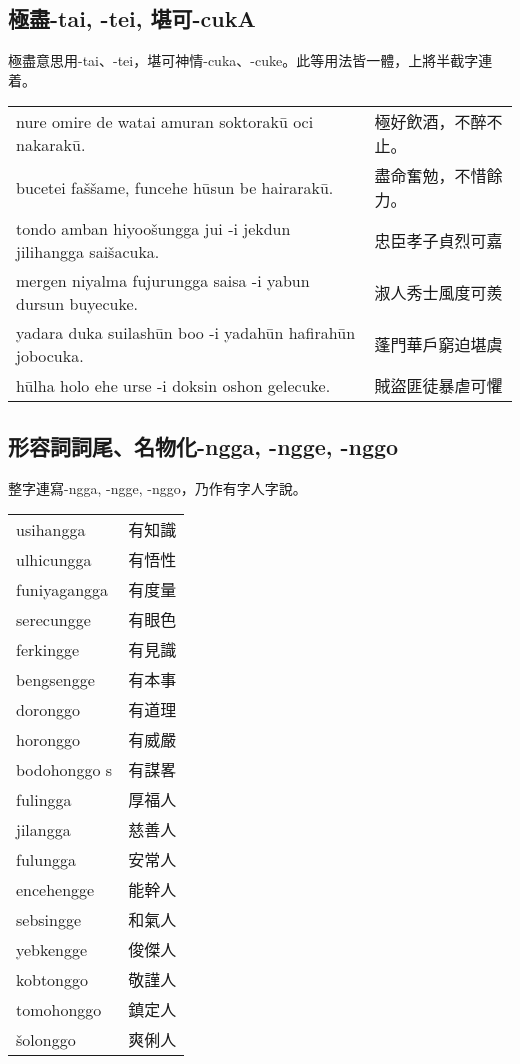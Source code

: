 \documentclass{article}
\begin{document}
\subsection{極盡-tai, -tei, 堪可-cukA}
\noindent 極盡意思用-tai、-tei，堪可神情-cuka、-cuke。此等用法皆一體，上將半截字連着。
\begin{center}
    \begin{tabularx}{\textwidth}{XX}
        nure omire de watai amuran soktorak\={u} oci nakarak\={u}. & 極好飲酒，不醉不止。\\
        bucetei fa\v{s}\v{s}ame, funcehe h\={u}sun be hairarak\={u}. & 盡命奮勉，不惜餘力。\\
        tondo amban hiyoo\v{s}ungga jui -i jekdun jilihangga sai\v{s}acuka. & 忠臣孝子貞烈可嘉\\
        mergen niyalma fujurungga saisa -i yabun dursun buyecuke. & 淑人秀士風度可羨\\
        yadara duka suilash\={u}n boo -i yadah\={u}n hafirah\={u}n jobocuka. & 蓬門華戶窮迫堪虞\\
        h\={u}lha holo ehe urse -i doksin oshon gelecuke. & 賊盜匪徒暴虐可懼
    \end{tabularx}
\end{center}

\subsection{形容詞詞尾、名物化-ngga, -ngge, -nggo}
\noindent 整字連寫-ngga, -ngge, -nggo，乃作有字人字說。
\begin{center}
    \begin{tabularx}{\textwidth}{XX}
        usihangga & 有知識\\
        ulhicungga & 有悟性\\
        funiyagangga & 有度量\\
        serecungge & 有眼色\\
        ferkingge & 有見識\\
        bengsengge & 有本事\\
        doronggo & 有道理\\
        horonggo & 有威嚴\\
        bodohonggo s& 有謀畧\\
        fulingga & 厚福人\\
        jilangga & 慈善人\\
        fulungga & 安常人\\
        encehengge & 能幹人\\
        sebsingge & 和氣人\\
        yebkengge & 俊傑人\\
        kobtonggo & 敬謹人\\
        tomohonggo & 鎮定人\\
        \v{s}olonggo & 爽俐人
    \end{tabularx}
\end{center}
\end{document}
